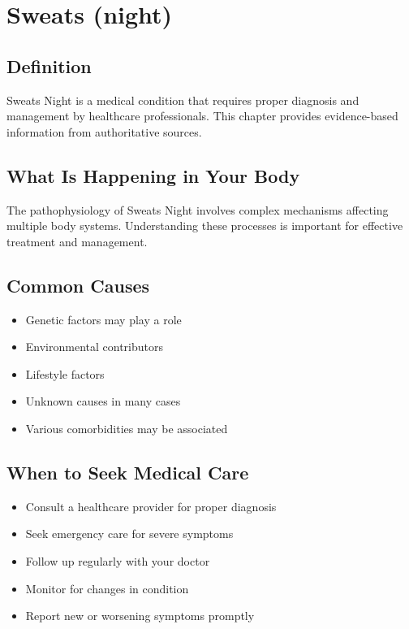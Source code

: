 
\chapter{Sweats (night)}

\section*{Definition}
Sweats Night is a medical condition that requires proper diagnosis and management by healthcare professionals. This chapter provides evidence-based information from authoritative sources.

\section*{What Is Happening in Your Body}
The pathophysiology of Sweats Night involves complex mechanisms affecting multiple body systems. Understanding these processes is important for effective treatment and management.

\section*{Common Causes}
\begin{itemize}
  \item Genetic factors may play a role
  \item Environmental contributors
  \item Lifestyle factors
  \item Unknown causes in many cases
  \item Various comorbidities may be associated
\end{itemize}

\section*{When to Seek Medical Care}
\begin{itemize}
  \item Consult a healthcare provider for proper diagnosis
  \item Seek emergency care for severe symptoms
  \item Follow up regularly with your doctor
  \item Monitor for changes in condition
  \item Report new or worsening symptoms promptly
\end{itemize}

